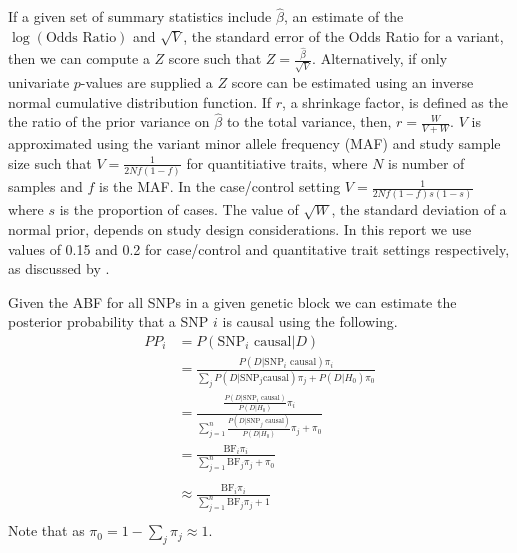 \documentclass[a4paper,11pt]{report}
\begin{document}
If a given set of summary statistics include $\hat{\beta}$, an  estimate of the $\log(\text{Odds Ratio})$ and $\sqrt{V}$, the standard error of the Odds Ratio for a variant, then we can compute a $Z$ score such that $Z= \frac{\hat{\beta}}{\sqrt{V}}$. Alternatively, if only univariate $p$-values are supplied a $Z$ score can be estimated using an inverse normal cumulative distribution function. If $r$, a shrinkage factor, is defined as the  the ratio of the prior variance on $\hat{\beta}$ to the total variance, then, $r = \frac{W}{V + W}$. $V$ is approximated using the variant minor allele frequency (MAF) and study sample size such that $V=\frac{1}{2Nf(1-f)}$ for quantitiative traits, where $N$ is number of samples and $f$ is the MAF. In the case/control setting $V=\frac{1}{2Nf(1-f)s(1-s)}$ where $s$ is the proportion of cases. The value of $\sqrt{W}$, the standard deviation of a normal prior, depends on study design considerations. In this report we use values of 0.15 and 0.2 for  case/control  and quantitative trait settings  respectively, as discussed by \citet{GiambartolomeiVukcevicSchadtEtAl2014}.

Given the ABF for all SNPs in a given genetic block we can estimate the posterior probability that a SNP $i$  is causal using the following. 
\begin{equation}
\label{form:bf_derivation}
\begin{split}
	PP_{i}& = P(\text{SNP}_{i}\text{ causal} | D)\\
	& = \frac{P(D | \text{SNP}_{i} \text{ causal})\pi_{i}}{\sum_{j}P(D | \text{SNP}_{j}\text{causal})\pi_{j} + P(D | H_{0})\pi_0}\\
	& = \frac{
				\frac{
					P(D | \text{SNP}_{i}\text{ causal})
				}
				{
					P(D|H_{0})
				}\pi_{i}
		}
		{
				\sum_{j=1}^n\frac{
					P(D | \text{SNP}_{j}\text{ causal})
				}
				{
					P(D|H_{0})
				}\pi_{j}  + \pi_0
		}	\\
	& = \frac{
		\text{BF}_{i}\pi_{i}
	}
	{
	\sum_{j=1}^n\text{BF}_{j}\pi_{j} + \pi_{0}
	} \\	
	\\
	& \approx \frac{
		\text{BF}_{i}\pi_{i}
	}
	{
	\sum_{j=1}^n\text{BF}_{j}\pi_{j} + 1
	} \\
\end{split}
\end{equation}
Note that as $\pi_{0} = 1-\sum_{j}\pi_{j} \approx 1$. 
\end{document}
